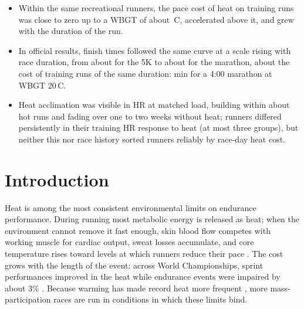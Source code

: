 \documentclass[12pt]{article}
\newcommand{\degC}{\,\textdegree C}
\begin{document}
\vspace{1em}
\begin{tcolorbox}[colback=white,colframe=black,boxrule=0.6pt,arc=0pt,left=6pt,right=6pt,top=4pt,bottom=4pt,title=Key points,coltitle=black,colbacktitle=gray!15,fonttitle=\bfseries]
\begin{itemize}[leftmargin=1.2em,itemsep=2pt,topsep=2pt]
\item Within the same recreational runners, the pace cost of heat on training runs was close to zero up to a WBGT of about \flatToWBGT\degC{}, accelerated above it, and grew with the duration of the run.
\item In official results, finish times followed the same curve at a scale rising with race duration, from about \alphaFiveKRound{} for the 5K to about \alphaMarRound{} for the marathon, about \ratioRound{} the cost of training runs of the same duration: \marMinTwenty{} min for a 4:00 marathon at WBGT 20\degC.
\item Heat acclimation was visible in HR at matched load, building within about \kinBuildRound{} hot runs and fading over one to two weeks without heat; runners differed persistently in their training HR response to heat (at most three groups), but neither this nor race history sorted runners reliably by race-day heat cost.
\end{itemize}
\end{tcolorbox}

\newpage
\doublespacing
\linenumbers

\section{Introduction}
Heat is among the most consistent environmental limits on endurance performance. During running most metabolic energy is released as heat; when the environment cannot remove it fast enough, skin blood flow competes with working muscle for cardiac output, sweat losses accumulate, and core temperature rises toward levels at which runners reduce their pace \cite{cheuvront2001,maughan2007,racinais2015}. The cost grows with the length of the event: across World Championships, sprint performances improved in the heat while endurance events were impaired by about 3\% \cite{guy2015art}. Because warming has made record heat more frequent \cite{king2017,russo2014}, more mass-participation races are run in conditions in which these limits bind.
\end{document}
